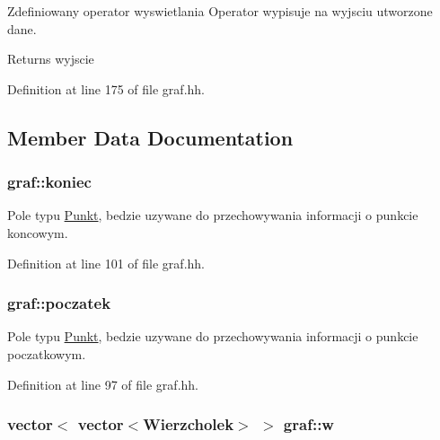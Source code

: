 Zdefiniowany operator wyswietlania Operator wypisuje na wyjsciu utworzone dane. 

\begin{DoxyReturn}{Returns}
wyjscie 
\end{DoxyReturn}


Definition at line 175 of file graf.\-hh.



\subsection{Member Data Documentation}
\hypertarget{classgraf_a484fe30b7f50d38d39bcb44d6ec88748}{
\subsubsection[{koniec}]{ graf\-::koniec\hspace{0.3cm}{\ttfamily [private]}}}\label{classgraf_a484fe30b7f50d38d39bcb44d6ec88748}


Pole typu \hyperlink{struct_punkt}{Punkt}, bedzie uzywane do przechowywania informacji o punkcie koncowym. 



Definition at line 101 of file graf.\-hh.

\hypertarget{classgraf_a9472ec2485e3ab3363425b57b23972ae}{
\subsubsection[{poczatek}]{ graf\-::poczatek\hspace{0.3cm}{\ttfamily [private]}}}\label{classgraf_a9472ec2485e3ab3363425b57b23972ae}


Pole typu \hyperlink{struct_punkt}{Punkt}, bedzie uzywane do przechowywania informacji o punkcie poczatkowym. 



Definition at line 97 of file graf.\-hh.

\hypertarget{classgraf_a28ea2247c2bbe840ad2ad7f9fa98d596}{
\subsubsection[{w}]{\setlength{\rightskip}{0pt plus 5cm}vector$<$ vector$<${\bf Wierzcholek}$>$ $>$ graf\-::w}}\label{classgraf_a28ea2247c2bbe840ad2ad7f9fa98d596}


